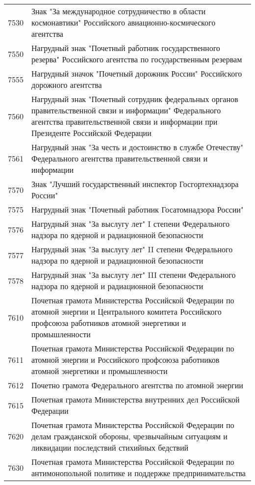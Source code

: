 \documentclass[10pt, a4paper, titlepage]{article}
\begin{document}
\begin{center}
\begin{longtable}{rp{}}
        7530 & Знак "За международное сотрудничество в области космонавтики" Российского авиационно-космического агентства \\
        7550 & Нагрудный знак "Почетный работник государственного резерва" Российского агентства по государственным резервам \\
        7555 & Нагрудный значок "Почетный дорожник России" Российского дорожного агентства \\
        7560 & Нагрудный знак "Почетный сотрудник федеральных органов правительственной связи и информации" Федерального агентства правительственной связи и информации при Президенте Российской Федерации \\
        7561 & Нагрудный знак "За честь и достоинство в службе Отечеству" Федерального агентства правительственной связи и информации \\
        7570 & Знак "Лучший государственный инспектор Госгортехнадзора России" \\
        7575 & Нагрудный знак "Почетный работник Госатомнадзора России" \\
        7576 & Нагрудный знак "За выслугу лет" I степени Федерального надзора по ядерной и радиационной безопасности \\
        7577 & Нагрудный знак "За выслугу лет" II степени Федерального надзора по ядерной и радиационной безопасности \\
        7578 & Нагрудный знак "За выслугу лет" III степени Федерального надзора по ядерной и радиационной безопасности \\
        7610 & Почетная грамота Министерства Российской Федерации по атомной энергии и Центрального комитета Российского профсоюза работников атомной энергетики и промышленности \\
        7611 & Почетная грамота Министерства Российской Федерации по атомной энергии и Российского профсоюза работников атомной энергетики и промышленности \\
        7612 & Почетно грамота Федерального агентства по атомной энергии \\
        7615 & Почетная грамота Министерства внутренних дел Российской Федерации \\
        7620 & Почетная грамота Министерства Российской Федерации по делам гражданской обороны, чрезвычайным ситуациям и ликвидации последствий стихийных бедствий \\
        7630 & Почетная грамота Министерства Российской Федерации по антимонопольной политике и поддержке предпринимательства \\

\end{longtable}
\end{center}
\end{document}
